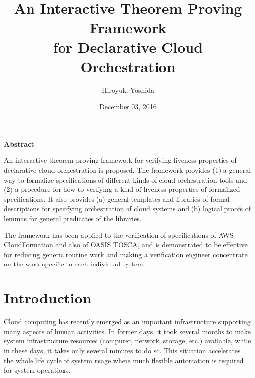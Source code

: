 \documentclass[12pt]{report}
\title{An Interactive Theorem Proving Framework\\for Declarative Cloud Orchestration}
\author{Hiroyuki Yoshida}
\date{December 03, 2016}
\begin{document}
\maketitle
{}  %
\setcounter{page}{1}
\strut
\vspace{20pt}
\begin{center}
{\LARGE\bf Abstract}
\end{center}
\vspace{20pt}
An interactive theorem proving framework for verifying liveness
properties of declarative cloud orchestration is proposed.  The
framework provides (1) a general way to formalize specifications of
different kinds of cloud orchestration tools and (2) a procedure for
how to verifying a kind of liveness properties of formalized
specifications.  It also provides (a) general templates and libraries
of formal descriptions for specifying orchestration of cloud systems
and (b) logical proofs of lemmas for general predicates of the
libraries.

The framework has been applied to the verification of specifications
of AWS CloudFormation and also of OASIS TOSCA, and is demonstrated to
be effective for reducing generic routine work and making a
verification engineer concentrate on the work specific to each
individual system.


\tableofcontents
\listoffigures
\newpage
{}
\setcounter{page}{1}

\chapter{Introduction}
Cloud computing has recently emerged as an important infrastructure
supporting many aspects of human activities. In former days, it took
several months to make system infrastructure resources (computer,
network, storage, etc.) available, while in these days, it takes only
several minutes to do so. This situation accelerates the whole life
cycle of system usage where much flexible automation is required for
system operations.
\end{document}
